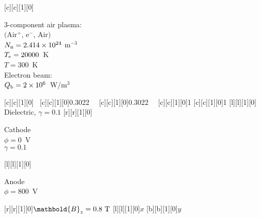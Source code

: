    [c][c][1][0]{\begin{minipage}{4.0cm} 
    { 3-component air plasma:}\\[0.3em]
    $\big($Air$^+$, e$^-$, Air$\big)$\\[0.3em]
    $N_{\rm n}=2.414 \times 10^{24}$ m$^{-3}$\\[0.3em]
    $T_{\rm e}=20000$~K\\[0.3em]
    $T=300$~K\\[0.6em]
    Electron beam:\\[0.3em]
    $Q_{\rm b}=2\times 10^6$~W/m$^3$
    \end{minipage}}
   [c][c][1][0]{~}
   [c][c][1][0]{0.3022~~}
   [c][c][1][0]{0.3022~~}
   [c][c][1][0]{1}
   [c][c][1][0]{1}
   [l][l][1][0]{{ Dielectric}, $\gamma=0.1$}
   [r][r][1][0]{\begin{minipage}{1.3cm}{ Cathode}\\$\phi=0$~V\\$\gamma=0.1$\end{minipage}}
   [l][l][1][0]{\begin{minipage}{1.6cm}{ Anode}\\$\phi=800$~V\end{minipage}}
   [r][r][1][0]{$\mathbold{B}_z=0.8~{\rm T}$}
   [l][l][1][0]{$x$}
   [b][b][1][0]{$y$}


